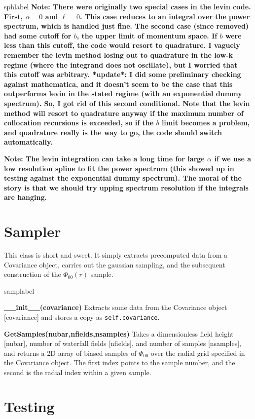 \documentclass[10pt,a4paper]{article}
\begin{document}
\begin{labeling}{sphlabel}
	\textbf{Note: There were originally two special cases in the levin code. First, $\alpha=0$ and $\ell=0$. This case reduces to an integral over the power spectrum, which is handled just fine. The second case (since removed) had some cutoff for $b$, the upper limit of momentum space. If $b$ were less than this cutoff, the code would resort to quadrature. I vaguely remember the levin method losing out to
	quadrature in the low-k regime (where the integrand does not oscillate), but I worried that this cutoff was arbitrary. 
	*update*: I did some preliminary checking against mathematica, and it doesn't seem to be the case that this outperforms levin in the stated regime (with an exponential dummy spectrum). So, I got rid of this second conditional. Note that the levin method will resort to quadrature anyway if the maximum number of collocation recursions is exceeded, so if the $b$ limit becomes a problem, and quadrature really is the way to go, the code should switch automatically.}
	
	\textbf{Note: The levin integration can take a long time for large $\alpha$ if we use a low resolution spline to fit the power spectrum (this showed up in testing against the exponential dummy spectrum). The moral of the story is that we should try upping spectrum resolution if the integrals are hanging.}
\end{labeling}

\section{Sampler}
This class is short and sweet. It simply extracts precomputed data from a Covariance object, carries out the gaussian sampling, and the subsequent construction of the $\Phi_{00}(r)$ sample.
\begin{labeling}{samplabel}
	\item[\textbf{\_\_init\_\_(covariance)}] Extracts some data from the
	Covariance object [covariance] and stores a copy as \verb|self.covariance|.
	
	\item[\textbf{GetSamples(nubar,nfields,nsamples)}] Takes a dimensionless field height [nubar], number of waterfall fields [nfields], and number of samples [nsamples], and returns a 2D array of biased samples of $\Phi_{00}$ over the radial grid specified in the Covariance object. The first index points to the sample number, and the second is the radial index within a given sample.
\end{labeling}
\section{Testing}
\end{document}
